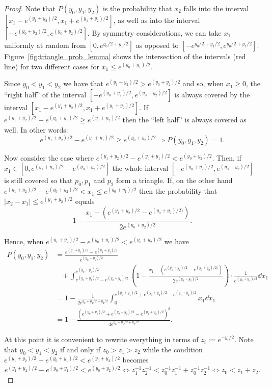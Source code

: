 \begin{proof}
Note that $P(y_0,y_1,y_2)$ is the probability that $x_2$ falls into the interval $[x_1-e^{(y_1+y_2)/2},x_1+e^{(y_1+y_2)/2}]$, as well as into the interval $[-e^{(y_0+y_2)/2},e^{(y_0+y_2)/2}]$. By symmetry considerations, we can take $x_1$ uniformly at random from $[0,e^{y_0/2+y_1/2}]$ as opposed to $[-e^{y_0/2+y_1/2}, e^{y_0/2+y_1/2}]$. Figure~\ref{fig:triangle_prob_lemma} shows the intersection of the intervals (red line) for two different cases for $x_1 \le e^{(y_0 + y_1)/2}$. 

Since $y_0 < y_1 < y_2$ we have that $e^{(y_1+y_2)/2} > e^{(y_0+y_2)/2}$ and so, when $x_1 \geq 0$, the ``right half'' of the 
interval $[-e^{(y_0+y_2)/2}, e^{(y_0+y_2)/2}]$ is always covered by the interval $[x_1-e^{(y_1+y_2)/2}, x_1+e^{(y_1+y_2)/2}]$.
If $e^{(y_1+y_2)/2} - e^{(y_0+y_1)/2} \geq e^{(y_0+y_2)/2}$ then the ``left half'' is always covered as well.
In other words:
\[
	e^{(y_1+y_2)/2} - e^{(y_0+y_1)/2} \geq e^{(y_0+y_2)/2} \Rightarrow P(y_0,y_1,y_2) = 1.
\]

Now consider the case where $e^{(y_1+y_2)/2} - e^{(y_0+y_1)/2} < e^{(y_0+y_2)/2}$. 
Then, if $x_1 \in [0, e^{(y_1+y_2)/2} - e^{(y_0+y_2)/2}]$ the whole interval $[-e^{(y_0+y_2)/2}, e^{(y_0+y_2)/2}]$ is still covered 
so that $p_0, p_1$ and $p_2$ form a triangle. If, on the other hand $e^{(y_1+y_2)/2} - e^{(y_0+y_2)/2} < x_1 \leq e^{(y_0+y_1)/2}$ then
the probability that $|x_2-x_1| \leq e^{(y_1+y_2)/2}$ equals
\[ 
	1 - \frac{x_1 - (e^{(y_1+y_2)/2} - e^{(y_0+y_2)/2)}) }{ 2e^{(y_0+y_2)/2} }. 
\]

Hence, when $e^{(y_1+y_2)/2} - e^{(y_0+y_1)/2} < e^{(y_0+y_2)/2}$ we have
\begin{align*}
	P(y_0,y_1,y_2) &= \frac{e^{(y_1+y_2)/2} - e^{(y_0+y_2)/2} }{ e^{(y_0+y_1)/2} }  \\
	&\hspace{10pt}+ \int_{ e^{(y_1+y_2)/2} - e^{(y_0+y_2)/2} }^{ e^{(y_0+y_1)/2} } 
	    \left(1 - \frac{x_1 - (e^{(y_1+y_2)/2} - e^{(y_0+y_2)/2)}) }{ 2e^{(y_0+y_2)/2} }\right)
	    \cdot \frac{1}{e^{(y_0+y_1)/2}} \dd x_1 \\
	&= 1 - \frac{1}{2e^{y_0+y_1/2+y_2/2} } \int_0^{ e^{(y_0+y_1)/2}+e^{(y_0+y_2)/2}-e^{(y_1+y_2)/2} } x_1 \dd x_1 \\
	&= 1 - \frac{ \left( e^{(y_0+y_1)/2}+e^{(y_0+y_2)/2}-e^{(y_1+y_2)/2} \right)^2 }{ 4 e^{y_0+y_1/2+y_2/2} }.
\end{align*}

At this point it is convenient to rewrite everything in terms of $z_i := e^{-y_i/2}$.
Note that $y_0 < y_1 < y_2$ if and only if $z_0 > z_1 > z_2$ while the condition $e^{(y_1+y_2)/2} - e^{(y_0+y_1)/2} < e^{(y_0+y_2)/2}$ becomes
\[ e^{(y_1+y_2)/2} - e^{(y_0+y_1)/2} < e^{(y_0+y_2)/2} \Leftrightarrow 
z_1^{-1} z_2^{-1} < z_0^{-1} z_1^{-1} + z_0^{-1}z_2^{-1} 
\Leftrightarrow
z_0 < z_1+z_2. 
\]


\end{proof}
